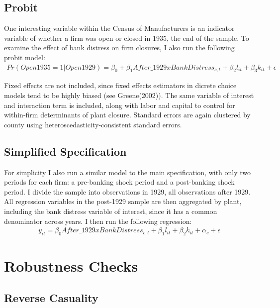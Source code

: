 \documentclass[letter,11pt]{article}
\begin{document}
{\subsection{Probit}

One interesting variable within the Census of Manufacturers is an indicator variable of whether a firm was open or closed in 1935, the end of the sample. To examine the effect of bank distress on firm closures, I also run the following probit model:
\begin{align*}
Pr(Open 1935 = 1 | Open 1929) = \beta_0 + \beta_1 After\_1929 x BankDistress_{c,t} + \beta_2 l_{it} + \beta_3  k_{it} + \epsilon
\end{align*}

Fixed effects are not included, since fixed effects estimators in dicrete choice models tend to be highly biased (see Greene(2002)). The same variable of interest and interaction term is included, along with labor and capital to control for within-firm determinants of plant closure. Standard errors are again clustered by county using heteroscedasticity-consistent standard errors. 

\subsection{Simplified Specification}

For simplicity I also run a similar model to the main specification, with only two periods for each firm: a pre-banking shock period and a post-banking shock period. I divide the sample into observations in 1929, all observations after 1929. All regression variables in the post-1929 sample are then aggregated by plant, including the bank distress variable of interest, since it has a common denominator across years. I then run the following regression:
\begin{align*}
y_{it} = \beta_0 After\_1929 x BankDistress_{c,t} + \beta_1 l_{it} + \beta_2 k_{it} + \alpha_c  + \epsilon
\end{align*}

\section{Robustness Checks}

\subsection{Reverse Casuality}

}
\end{document}
